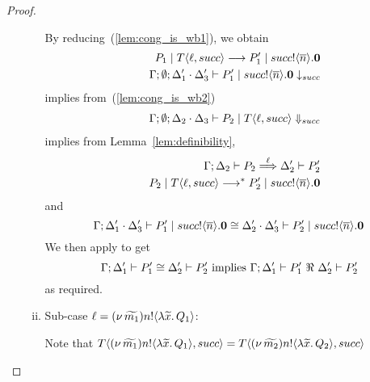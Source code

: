 \begin{proof}
\begin{enumerate}
\begin{enumerate}[i.]
						\noi By reducing~(\ref{lem:cong_is_wb1}), we obtain
						\begin{eqnarray*}
							&& P_1 \;|\; T\langle \ell, succ \rangle \longrightarrow P_1' \;|\; succ ! \langle \overline{n} \rangle . \mathbf{0} \\
							&& \Gamma; \emptyset; \Delta_1' \cdot \Delta_3' \vdash P_1' \;|\; succ ! \langle \overline{n} \rangle . \mathbf{0} \downarrow_{succ}
						\end{eqnarray*}
						\noi implies from~(\ref{lem:cong_is_wb2})
						\begin{eqnarray*}
							&& \Gamma; \emptyset; \Delta_2 \cdot \Delta_3 \vdash P_2 \;|\; T\langle \ell, succ \rangle \Downarrow_{succ}
						\end{eqnarray*}
						\noi implies from Lemma~\ref{lem:definibility},
						\begin{eqnarray*}
							&& \Gamma; \Delta_2 \vdash P_2 \stackrel{\ell}{\Longrightarrow} \Delta_2' \vdash P_2'\\
							&& P_2 \;|\; T \langle \ell, succ \rangle \longrightarrow^{*} P_2' \;|\; succ ! \langle \overline{n} \rangle . \mathbf{0}
						\end{eqnarray*}
						\noi and
						\[
							\Gamma; \Delta_1' \cdot \Delta_3' \vdash P_1' \;|\; succ ! \langle \overline{n} \rangle .\mathbf{0} \cong \Delta_2' \cdot \Delta_3' \vdash P_2' \;|\; succ ! \langle \overline{n} \rangle . \mathbf{0}
						\]
						We then apply  to get
						\[
							\horel{\Gamma}{\Delta_1'}{P_1'}{\cong}{\Delta_2'}{P_2'} \text{ implies } \horel{\Gamma}{\Delta_1'}{P_1'}{\ \Re\ }{\Delta_2'}{P_2'}
						\]
						\noi as required.

				\item	Sub-case $\ell = (\nu\, \widetilde{m_1}) n ! \langle \lambda \widetilde{x}.\,Q_1 \rangle$:

						\noi Note that $T\langle (\nu\, \widetilde{m_1}) n ! \langle \lambda \widetilde{x}.\, Q_1 \rangle, succ \rangle = T\langle (\nu\, \widetilde{m_2}) n ! \langle \lambda \widetilde{x}.\,Q_2 \rangle, succ \rangle$


\end{enumerate}
\end{enumerate}
\end{proof}
